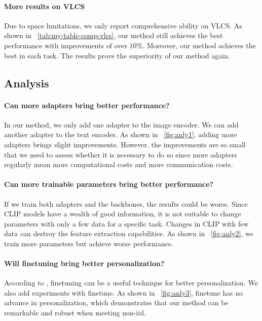 \documentclass[11pt]{article}
\begin{document}
\paragraph{More results on VLCS}

Due to space limitations, we only report comprehensive ability on VLCS.
As shown in \tablename~\ref{tab:my-table-comp-vlcs}, our method still achieves the best performance with improvements of over $10\%$.
Moreover, our method achieves the best in each task.
The results prove the superiority of our method again.


\subsection{Analysis}

\paragraph{Can more adapters bring better performance?}
In our method, we only add one adapter to the image encoder.
We can add another adapter to the text encoder.
As shown in \figurename~\ref{fig:anly1}, adding more adapters brings slight improvements.
However, the improvements are so small that we need to assess whether it is necessary to do so since more adapters regularly mean more computational costs and more communication costs.

\paragraph{Can more trainable parameters bring better performance?}
If we train both adapters and the backbones, the results could be worse.
Since CLIP models have a wealth of good information, it is not suitable to change parameters with only a few data for a specific task.
Changes in CLIP with few data can destroy the feature extraction capabilities.
As shown in \figurename~\ref{fig:anly2}, we train more parameters but achieve worse performance.

\paragraph{Will finetuning bring better personalization?}
According to \cite{Jindong-yu2020salvaging}, finetuning can be a useful technique for better personalization.
We also add experiments with finetune.
As shown in \figurename~\ref{fig:anly3}, finetune has no advance in personalization, which demonstrates that our method can be remarkable and robust when meeting non-iid.
\end{document}
